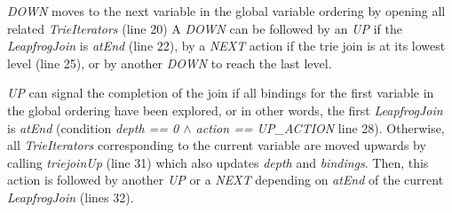 \textit{DOWN} moves to the next variable in the global variable ordering by opening all related \textit{TrieIterators}
(line 20) %
A \textit{DOWN} can be followed by an \textit{UP} if the \textit{LeapfrogJoin} is \textit{atEnd} (line 22),
by a \textit{NEXT} action if the trie join is at its lowest level (line 25), or by another \textit{DOWN} to reach the last level.

\textit{UP} can signal the completion of the join if all bindings for the first variable in the global ordering have
been explored, or in other words, the first \textit{LeapfrogJoin} is \textit{atEnd} (condition
\textit{depth == 0 $\wedge$ action ==  UP\_ACTION} line 28). %
Otherwise, all \textit{TrieIterators} corresponding to the current variable are moved upwards by calling \textit{triejoinUp} (line 31)
which also updates \textit{depth} and \textit{bindings}.  %
Then, this action is followed by another \textit{UP} or a \textit{NEXT} depending on \textit{atEnd} of the current \textit{LeapfrogJoin}
(lines 32). %

